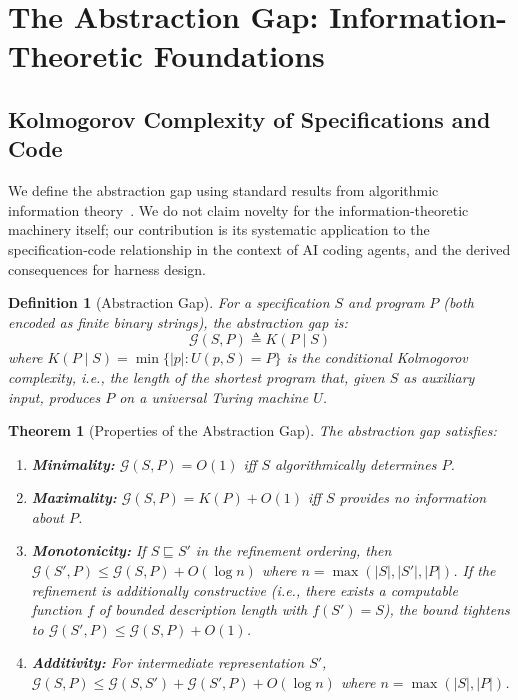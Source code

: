 \documentclass[11pt, a4paper, copyright]{googledeepmind}
\newtheorem{definition}{Definition}[section]
\newtheorem{theorem}{Theorem}[section]
\begin{document}
\section{The Abstraction Gap: Information-Theoretic Foundations}
\label{sec:information-theory}

\subsection{Kolmogorov Complexity of Specifications and Code}

We define the abstraction gap using standard results from algorithmic information theory~\citep{kolmogorov1965three, chaitin1966length, li2019introduction}. We do not claim novelty for the information-theoretic machinery itself; our contribution is its systematic application to the specification-code relationship in the context of AI coding agents, and the derived consequences for harness design.

\begin{definition}[Abstraction Gap]
For a specification $S$ and program $P$ (both encoded as finite binary strings), the \emph{abstraction gap} is:
\begin{equation}
    \mathcal{G}(S, P) \triangleq K(P \mid S)
\end{equation}
where $K(P \mid S) = \min\{|p| : U(p, S) = P\}$ is the conditional Kolmogorov complexity, i.e., the length of the shortest program that, given $S$ as auxiliary input, produces $P$ on a universal Turing machine $U$.
\end{definition}

\begin{theorem}[Properties of the Abstraction Gap]
\label{thm:gap-properties}
The abstraction gap satisfies:
\begin{enumerate}
    \item \textbf{Minimality:} $\mathcal{G}(S, P) = O(1)$ iff $S$ algorithmically determines $P$.
    \item \textbf{Maximality:} $\mathcal{G}(S, P) = K(P) + O(1)$ iff $S$ provides no information about $P$.
    \item \textbf{Monotonicity:} If $S \sqsubseteq S'$ in the refinement ordering, then $\mathcal{G}(S', P) \leq \mathcal{G}(S, P) + O(\log n)$ where $n = \max(|S|, |S'|, |P|)$. If the refinement is additionally \emph{constructive} (i.e., there exists a computable function $f$ of bounded description length with $f(S') = S$), the bound tightens to $\mathcal{G}(S', P) \leq \mathcal{G}(S, P) + O(1)$.
    \item \textbf{Additivity:} For intermediate representation $S'$, $\mathcal{G}(S, P) \leq \mathcal{G}(S, S') + \mathcal{G}(S', P) + O(\log n)$ where $n = \max(|S|, |P|)$.
\end{enumerate}
\end{theorem}
\end{document}
